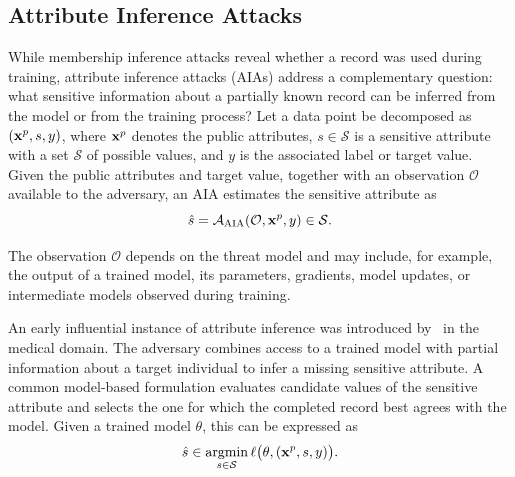 \subsection{Attribute Inference Attacks}\label{sec:aia}

While membership inference attacks reveal whether a record was used during training, attribute inference attacks (AIAs) address a complementary question: what sensitive information about a partially known record can be inferred from the model or from the training process? Let a data point be decomposed as $({\mathbf{x}}^p,s,y)$, where ${\mathbf{x}}^p$ denotes the public attributes, $s\in\mathcal{S}$ is a sensitive attribute with a set $\mathcal{S}$ of possible values, and $y$ is the associated label or target value. Given the public attributes and target value, together with an observation $\mathcal{O}$ available to the adversary, an AIA estimates the sensitive attribute as
\begin{equation}
     \hat s = \mathcal{A}_{\mathrm{AIA}}(\mathcal{O}, {\mathbf{x}}^p, y) \in \mathcal{S} .
\end{equation}

The observation $\mathcal{O}$ depends on the threat model and may include, for example, the output of a trained model, its parameters, gradients, model updates, or intermediate models observed during training.

An early influential instance of attribute inference was introduced by~ in the medical domain. The adversary combines access to a trained model with partial information about a target individual to infer a missing sensitive attribute. A common model-based formulation evaluates candidate values of the sensitive attribute and selects the one for which the completed record best agrees with the model. Given a trained model $\theta$, this can be expressed as
\begin{equation}\label{eq:aia_mb}
\hat{s}
\in
\operatorname*{argmin}_{s\in\mathcal{S}}
\ell\bigl(\theta,({\mathbf{x}}^p,s,y)\bigr).
\end{equation}


